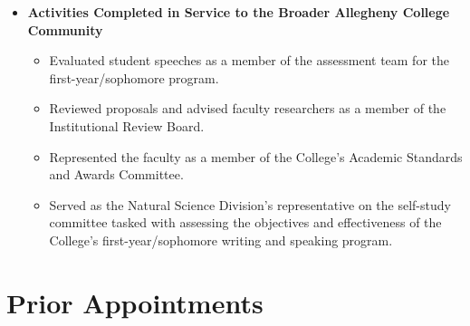 \documentclass[11pt,letterpaper,sans]{moderncv}
\begin{document}
{\begin{itemize}
\begin{itemize}
          and undergraduate students.
      \end{itemize}
    \item \textbf{Activities Completed in Service to the Broader Allegheny
      College Community}
      \begin{itemize} \renewcommand\labelitemi{\Large\textbullet}
        \item Evaluated student speeches as a member of the assessment team for
          the first-year/sophomore program.
        \item Reviewed proposals and advised faculty researchers as a member of
          the Institutional Review Board.
        \item Represented the faculty as a member of the College's Academic
          Standards and Awards Committee.
        \item Served as the Natural Science Division's representative on the
          self-study committee tasked with assessing the objectives and
          effectiveness of the College's first-year/sophomore writing and
          speaking program.
      \end{itemize}
  \end{itemize}
}

%
\vspace*{-.1in}
%
\section{Prior Appointments}

%

%

%

%
\end{document}
